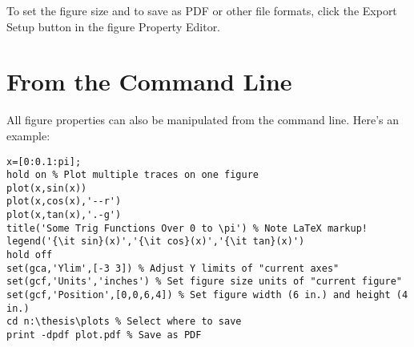\documentclass[letterpaper,12pt,titlepage,oneside,final]{book}
\let\origdoublepage\cleardoublepage
\newcommand{\clearemptydoublepage}{%
  \clearpage{\pagestyle{empty}\origdoublepage}}
\let\cleardoublepage\clearemptydoublepage
\begin{document}
To set the figure size and to save as PDF or other file formats, click the Export Setup button in the figure Property Editor.

\section{From the Command Line} 
All figure properties can also be manipulated from the command line. Here's an example: 
\begin{verbatim}
x=[0:0.1:pi];
hold on % Plot multiple traces on one figure
plot(x,sin(x))
plot(x,cos(x),'--r')
plot(x,tan(x),'.-g')
title('Some Trig Functions Over 0 to \pi') % Note LaTeX markup!
legend('{\it sin}(x)','{\it cos}(x)','{\it tan}(x)')
hold off
set(gca,'Ylim',[-3 3]) % Adjust Y limits of "current axes"
set(gcf,'Units','inches') % Set figure size units of "current figure"
set(gcf,'Position',[0,0,6,4]) % Set figure width (6 in.) and height (4 in.)
cd n:\thesis\plots % Select where to save
print -dpdf plot.pdf % Save as PDF
\end{verbatim}




\cleardoublepage %
\renewcommand*{\bibname}{References}




\nocite{*}
\end{document}
